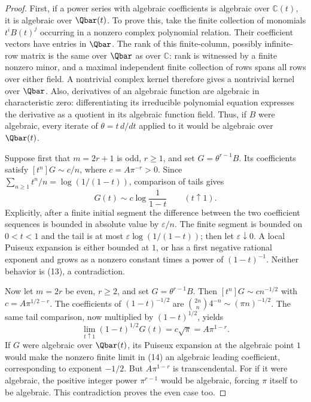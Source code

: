 \documentclass[11pt,a4paper]{article}
\numberwithin{equation}{section}
\theoremstyle{definition}
\theoremstyle{remark}
\begin{document}
\begin{proof}
First, if a power series with algebraic coefficients is algebraic over
$\mathbb C(t)$, it is algebraic over $\Qbar(t)$.  To prove this, take
the finite collection of monomials $t^iB(t)^j$ occurring in a nonzero
complex polynomial relation.  Their coefficient vectors have entries
in $\Qbar$.  The rank of this finite-column, possibly infinite-row
matrix is the same over $\Qbar$ as over $\mathbb C$: rank is witnessed
by a finite nonzero minor, and a maximal independent finite collection
of rows spans all rows over either field.  A nontrivial complex kernel
therefore gives a nontrivial kernel over $\Qbar$.
Also, derivatives of an algebraic function are algebraic in
characteristic zero: differentiating its irreducible polynomial
equation expresses the derivative as a quotient in its algebraic
function field.  Thus, if $B$ were algebraic, every iterate of
$\theta=t\,d/dt$ applied to it would be algebraic over $\Qbar(t)$.

Suppose first that $m=2r+1$ is odd, $r\ge1$, and set
$G=\theta^{r-1}B$.  Its coefficients satisfy
$[t^n]G\sim c/n$, where $c=A\pi^{-r}>0$.  Since
$\sum_{n\ge1}t^n/n=\log(1/(1-t))$, comparison of tails gives
\[
 G(t)\sim c\log\frac1{1-t}\qquad(t\uparrow1).       \tag{13}
\]
Explicitly, after a finite initial segment the difference between the
two coefficient sequences is bounded in absolute value by
$\varepsilon/n$.  The finite segment is bounded on $0<t<1$ and the
tail is at most $\varepsilon\log(1/(1-t))$; then let
$\varepsilon\downarrow0$.
A local Puiseux expansion is either bounded at $1$, or has a first
negative rational exponent and grows as a nonzero constant times a
power of $(1-t)^{-1}$.  Neither behavior is (13), a contradiction.

Now let $m=2r$ be even, $r\ge2$, and set
$G=\theta^{r-1}B$.  Then
$[t^n]G\sim c n^{-1/2}$ with $c=A\pi^{1/2-r}$.
The coefficients of $(1-t)^{-1/2}$ are
$\binom{2n}{n}4^{-n}\sim(\pi n)^{-1/2}$.  The same tail comparison,
now multiplied by $(1-t)^{1/2}$, yields
\[
 \lim_{t\uparrow1}(1-t)^{1/2}G(t)
        =c\sqrt\pi=A\pi^{1-r}.                    \tag{14}
\]
If $G$ were algebraic over $\Qbar(t)$, its Puiseux expansion at the
algebraic point $1$ would make the nonzero finite limit in (14) an
algebraic leading coefficient, corresponding to exponent $-1/2$.
But $A\pi^{1-r}$ is transcendental.  For if it were algebraic, the
positive integer power $\pi^{r-1}$ would be algebraic, forcing $\pi$
itself to be algebraic.  This contradiction proves the even case too.
\end{proof}
\end{document}
